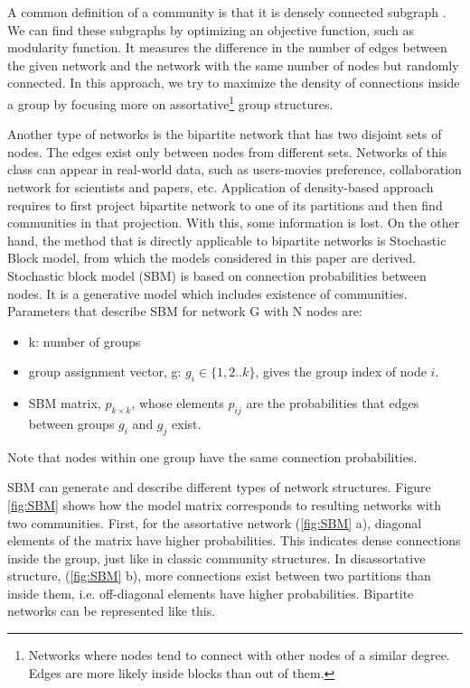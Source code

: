 A common definition of a community is that it is densely connected subgraph \cite{userguide}. We can find these subgraphs by optimizing an objective function, such as modularity function. It measures the difference in the number of edges between the given network and the network with the same number of nodes but randomly connected. In this approach, we try to maximize the density of connections inside a group by focusing more on assortative\footnote{Networks where nodes tend to connect with other nodes of a similar degree. Edges are more likely inside blocks than out of them.} group structures. 

Another type of networks is the bipartite network that has two disjoint sets of nodes. The edges exist only between nodes from different sets. Networks of this class can appear in real-world data, such as users-movies preference, collaboration network for scientists and papers, etc. Application of density-based approach requires to first project bipartite network to one of its partitions and then find communities in that projection. With this, some information is lost. On the other hand, the method that is directly applicable to bipartite networks is Stochastic Block model, from which the models considered in this paper are derived. \\

Stochastic block model (SBM) is based on connection probabilities between nodes. It is a generative model which includes existence of communities. Parameters that describe SBM for network G with N nodes are:

\begin{itemize}
	\item k: number of groups
	\item group assignment vector, g: $g_i \in\{1,2..k\}$, gives the group index of node $i$.
	\item SBM matrix, $p_{k \times k}$, whose elements $p_{ij}$ are the probabilities that edges between groups $g_i$ and $g_j$ exist.
\end{itemize}

Note that nodes within one group have the same connection probabilities.

SBM can generate and describe different types of network structures. Figure \ref{fig:SBM} \cite{userguide} shows how the model matrix corresponds to resulting networks with two communities. First, for the assortative network (\ref{fig:SBM} a), diagonal elements of the matrix have higher probabilities. This indicates dense connections inside the group, just like in classic community structures. In disassortative structure, (\ref{fig:SBM} b), more connections exist between two partitions than inside them, i.e. off-diagonal elements have higher probabilities. Bipartite networks can be represented like this. 

